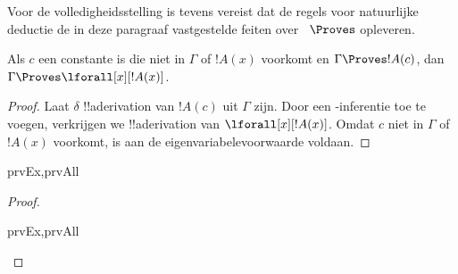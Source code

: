 \documentclass[../../../include/open-logic-section]{subfiles}
\begin{document}


\begin{explain}
  Voor de volledigheidsstelling is tevens vereist dat de regels voor
  natuurlijke deductie de in deze paragraaf vastgestelde feiten over
  ~$\Proves$ opleveren.
\end{explain}

\begin{thm}
 Als $c$ een constante is die niet
in $\Gamma$ of $!A(x)$ voorkomt en $\Gamma \Proves !A(c)$, dan $\Gamma
\Proves \lforall[x][!A(x)]$.
\end{thm}

\begin{proof}
Laat $\delta$ !!a{derivation} van $!A(c)$ uit $\Gamma$ zijn. Door een
\Intro{\lforall}-inferentie toe te voegen, verkrijgen we
!!a{derivation} van $\lforall[x][!A(x)]$. Omdat $c$ niet in $\Gamma$
of $!A(x)$ voorkomt, is aan de eigenvariabelevoorwaarde voldaan.
\end{proof}

\begin{prop}
\begin{tagenumerate}{prvEx,prvAll}

\end{tagenumerate}
\end{prop}

\begin{proof}
\begin{tagenumerate}{prvEx,prvAll}

\end{tagenumerate}
\end{proof}
\end{document}
